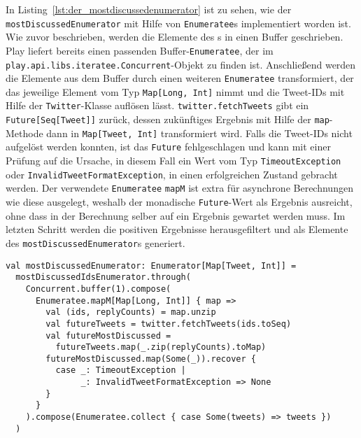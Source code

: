 In Listing~\ref{lst:der_mostdiscussedenumerator} ist zu sehen, wie der \lstinline|mostDiscussedEnumerator| mit Hilfe von \lstinline|Enumeratee|s implementiert worden ist.
Wie zuvor beschrieben, werden die Elemente des s in einen Buffer geschrieben.
Play liefert bereits einen passenden Buffer-\lstinline|Enumeratee|, der im \lstinline|play.api.libs.iteratee.Concurrent|-Objekt zu finden ist.
Anschließend werden die Elemente aus dem Buffer durch einen weiteren \lstinline|Enumeratee| transformiert, der das jeweilige Element vom Typ \lstinline|Map[Long, Int]| nimmt und die Tweet-IDs mit Hilfe der \lstinline|Twitter|-Klasse auflösen lässt.
\lstinline|twitter.fetchTweets| gibt ein \lstinline|Future[Seq[Tweet]]| zurück, dessen zukünftiges Ergebnis mit Hilfe der \lstinline|map|-Methode dann in \lstinline|Map[Tweet, Int]| transformiert wird.
Falls die Tweet-IDs nicht aufgelöst werden konnten, ist das \lstinline|Future| fehlgeschlagen und kann mit einer Prüfung auf die Ursache, in diesem Fall ein Wert vom Typ \lstinline|TimeoutException| oder \lstinline|InvalidTweetFormatException|, in einen erfolgreichen Zustand gebracht werden.
Der verwendete \lstinline|Enumeratee| \lstinline|mapM| ist extra für asynchrone Berechnungen wie diese ausgelegt, weshalb der monadische \lstinline|Future|-Wert als Ergebnis ausreicht, ohne dass in der Berechnung selber auf ein Ergebnis gewartet werden muss.
Im letzten Schritt werden die positiven Ergebnisse herausgefiltert und als Elemente des \lstinline|mostDiscussedEnumerator|s generiert.

\begin{lstlisting}[caption=Der mostDiscussedEnumerator, label=lst:der_mostdiscussedenumerator]
val mostDiscussedEnumerator: Enumerator[Map[Tweet, Int]] =
  mostDiscussedIdsEnumerator.through(
    Concurrent.buffer(1).compose(
      Enumeratee.mapM[Map[Long, Int]] { map =>
        val (ids, replyCounts) = map.unzip
        val futureTweets = twitter.fetchTweets(ids.toSeq)
        val futureMostDiscussed =
          futureTweets.map(_.zip(replyCounts).toMap)
        futureMostDiscussed.map(Some(_)).recover {
          case _: TimeoutException |
               _: InvalidTweetFormatException => None
        }
      }
    ).compose(Enumeratee.collect { case Some(tweets) => tweets })
  )
\end{lstlisting}



